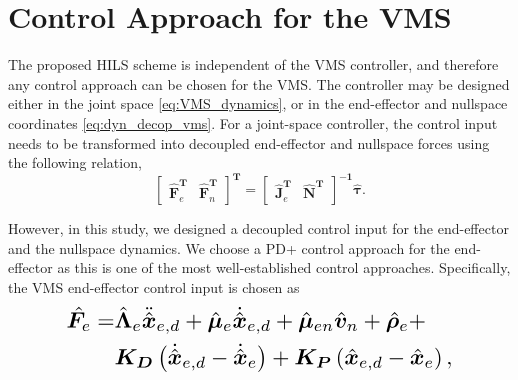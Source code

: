 \documentclass[../main.tex]{subfiles}
\begin{document}
\section{Control Approach for the VMS}
\label{sec:control}
The proposed HILS scheme is independent of the VMS controller, and therefore any control approach can be chosen for the VMS. The controller may be designed either in the joint space \eqref{eq:VMS_dynamics}, or in the end-effector and nullspace coordinates \eqref{eq:dyn_decop_vms}.
For a joint-space controller, the control input needs to be transformed into decoupled end-effector and nullspace forces using the following relation,
\begin{equation}
    \begin{bmatrix}
\hat{\bm{F}}_e^{\bm{T}} & \hat{\bm{F}}_n^{\bm{T}}
\end{bmatrix}^{\bm{T}} =
\begin{bmatrix}\hat{\bm{J}}_e^{\bm{T}} & \hat{\bm{N}}^{\bm{T}}
\end{bmatrix}^{\bm{-1}}
\bm{\hat{\tau}}.
\end{equation} \par 
However, in this study, we designed a decoupled control input for the end-effector and the nullspace dynamics. We choose a PD+ control approach\cite{paden1988} for the end-effector as this is one of the most well-established control approaches.
Specifically, the VMS end-effector control input is chosen as
\begin{equation}
\label{eq:vms_control}
\resizebox{0.8\hsize}{!}{$\begin{aligned}
\hat{\bm{F}_e} = & \hat{\bm{\Lambda}}_e \ddot{\hat{\bm{x}}}_{e,d} + {\hat{\bm{\mu}}}_{e}  \dot{\hat{\bm{x}}}_{e,d}    + {\hat{\bm{\mu}}}_{en}
\hat{\bm{v}}_n + \hat{\bm{\rho}}_e + \\
& \bm{K_D}\left( \dot{\hat{\bm{x}}}_{e,d} - \dot{\hat{\bm{x}}}_e \right) + \bm{K_P} \left(  {\hat{\bm{x}}}_{e,d} - {\hat{\bm{x}}}_e \right),
\end{aligned}$}
\end{equation}
\end{document}
